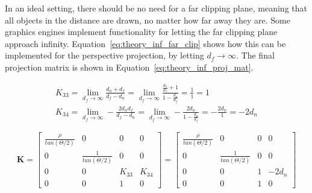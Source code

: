 In an ideal setting, there should be no need for a far clipping plane, meaning that all objects in the distance are drawn, no matter how far away they are. Some graphics engines implement functionality for letting the far clipping plane approach infinity. Equation~\eqref{eq:theory_inf_far_clip} shows how this can be implemented for the perspective projection, by letting $d_f \rightarrow \infty$. The final projection matrix is shown in Equation~\eqref{eq:theory_inf_proj_mat}.

\begin{equation}
    \begin{aligned}
    K_{33} = \lim_{d_f \rightarrow \infty} \frac{d_n+d_f}{d_f-d_n} =
    \lim_{d_f \rightarrow \infty} \frac{\frac{d_n}{d_f}+1}{1-\frac{d_n}{d_f}} = 
    \frac{1}{1} = 1 \\
    K_{34} = \lim_{d_f \rightarrow \infty} -\frac{2d_n d_f}{d_f-d_n} = 
    \lim_{d_f \rightarrow \infty} -\frac{2d_n}{1-\frac{d_n}{d_f}} =
    -\frac{2d_n}{1} = -2d_n
    \end{aligned}
    \label{eq:theory_inf_far_clip}
\end{equation}

\begin{equation}
    \mathbf{K} = \begin{bmatrix}
        \frac{\rho}{tan(\Theta/2)} & 0 & 0 & 0 \\
        0 & \frac{1}{tan(\Theta/2)} & 0 & 0 \\
        0 & 0 & K_{33} & K_{34} \\
        0 & 0 & 1 & 0 
    \end{bmatrix} = \begin{bmatrix}
        \frac{\rho}{tan(\Theta/2)} & 0 & 0 & 0 \\
        0 & \frac{1}{tan(\Theta/2)} & 0 & 0 \\
        0 & 0 & 1 & -2d_n \\
        0 & 0 & 1 & 0 
    \end{bmatrix}
    \label{eq:theory_inf_proj_mat}
\end{equation}




